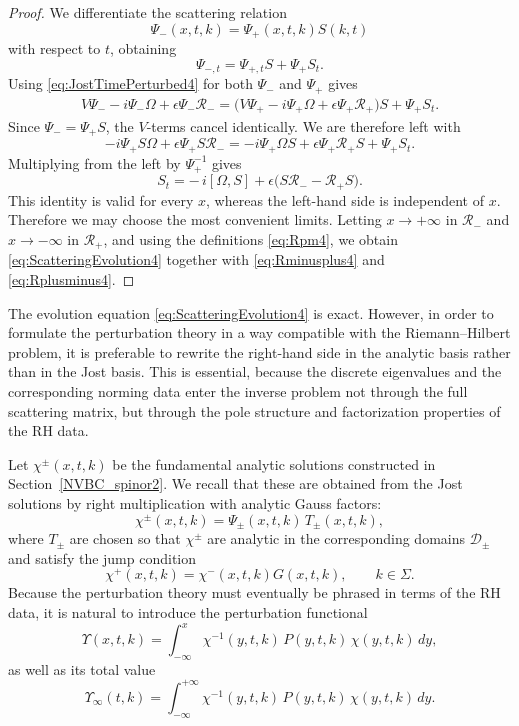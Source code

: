 \documentclass[11pt]{amsart}
\theoremstyle{definition}
\numberwithin{equation}{section}
\begin{document}
\begin{proof}
We differentiate the scattering relation
\[
\Psi_-(x,t,k)=\Psi_+(x,t,k)S(k,t)
\]
with respect to $t$, obtaining
\begin{equation}
\Psi_{-,t}=\Psi_{+,t}S+\Psi_+S_t.
\label{eq:ScatDiff4}
\end{equation}
Using \eqref{eq:JostTimePerturbed4} for both $\Psi_-$ and $\Psi_+$ gives
\begin{align}
V\Psi_- - i\Psi_-\Omega + \epsilon \Psi_-\mathcal{R}_-
=
\bigl(V\Psi_+ - i\Psi_+\Omega + \epsilon \Psi_+\mathcal{R}_+\bigr)S + \Psi_+S_t.
\label{eq:ScatIntermediate4}
\end{align}
Since $\Psi_-=\Psi_+S$, the $V$-terms cancel identically. We are therefore left with
\[
-i\Psi_+S\Omega + \epsilon \Psi_+S\mathcal{R}_-
=
-i\Psi_+\Omega S + \epsilon \Psi_+\mathcal{R}_+S + \Psi_+S_t.
\]
Multiplying from the left by $\Psi_+^{-1}$ gives
\[
S_t = -\,i[\Omega,S] + \epsilon\bigl(S\mathcal{R}_- - \mathcal{R}_+S\bigr).
\]
This identity is valid for every $x$, whereas the left-hand side is independent of $x$. Therefore we may choose the most convenient limits. Letting $x\to+\infty$ in $\mathcal{R}_-$ and $x\to-\infty$ in $\mathcal{R}_+$, and using the definitions \eqref{eq:Rpm4}, we obtain \eqref{eq:ScatteringEvolution4} together with \eqref{eq:Rminusplus4} and \eqref{eq:Rplusminus4}.
\end{proof}

The evolution equation \eqref{eq:ScatteringEvolution4} is exact. However, in order to formulate the perturbation theory in a way compatible with the Riemann--Hilbert problem, it is preferable to rewrite the right-hand side in the analytic basis rather than in the Jost basis. This is essential, because the discrete eigenvalues and the corresponding norming data enter the inverse problem not through the full scattering matrix, but through the pole structure and factorization properties of the RH data.

Let $\chi^\pm(x,t,k)$ be the fundamental analytic solutions constructed in Section~\ref{NVBC_spinor2}. We recall that these are obtained from the Jost solutions by right multiplication with analytic Gauss factors:
\begin{equation}
\chi^\pm(x,t,k)=\Psi_\pm(x,t,k)\,T_\pm(x,t,k),
\label{eq:ChiPsiRelation4}
\end{equation}
where $T_\pm$ are chosen so that $\chi^\pm$ are analytic in the corresponding domains $\mathcal D_\pm$ and satisfy the jump condition
\[
\chi^+(x,t,k)=\chi^-(x,t,k)G(x,t,k), \qquad k\in\Sigma.
\]
Because the perturbation theory must eventually be phrased in terms of the RH data, it is natural to introduce the perturbation functional
\begin{equation}
\Upsilon(x,t,k)=\int_{-\infty}^{x}\chi^{-1}(y,t,k)\,P(y,t,k)\,\chi(y,t,k)\,dy,
\label{eq:Upsilon4}
\end{equation}
as well as its total value
\begin{equation}
\Upsilon_\infty(t,k)=\int_{-\infty}^{+\infty}\chi^{-1}(y,t,k)\,P(y,t,k)\,\chi(y,t,k)\,dy.
\label{eq:UpsilonInfinity4}
\end{equation}
\end{document}
